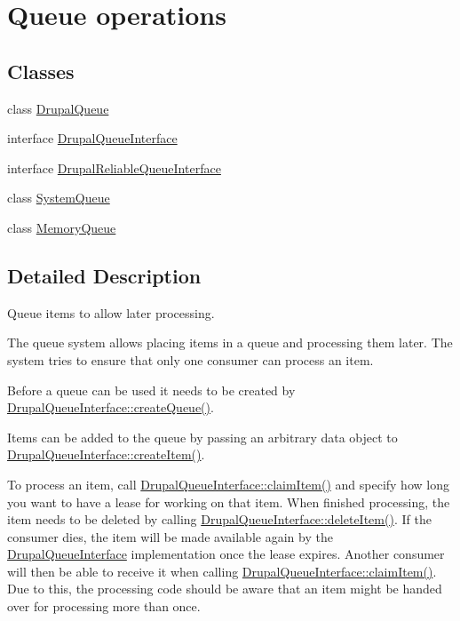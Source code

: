 \hypertarget{group__queue}{
\section{Queue operations}
\label{group__queue}
}
\subsection*{Classes}
\begin{DoxyCompactItemize}
\item 
class \hyperlink{classDrupalQueue}{DrupalQueue}
\item 
interface \hyperlink{interfaceDrupalQueueInterface}{DrupalQueueInterface}
\item 
interface \hyperlink{interfaceDrupalReliableQueueInterface}{DrupalReliableQueueInterface}
\item 
class \hyperlink{classSystemQueue}{SystemQueue}
\item 
class \hyperlink{classMemoryQueue}{MemoryQueue}
\end{DoxyCompactItemize}


\subsection{Detailed Description}
Queue items to allow later processing.

The queue system allows placing items in a queue and processing them later. The system tries to ensure that only one consumer can process an item.

Before a queue can be used it needs to be created by \hyperlink{interfaceDrupalQueueInterface_a5a657d8c1d5bb429b3e594fa0c883ad3}{DrupalQueueInterface::createQueue()}.

Items can be added to the queue by passing an arbitrary data object to \hyperlink{interfaceDrupalQueueInterface_a1bdef6341808aaf8b3de821b7b71f137}{DrupalQueueInterface::createItem()}.

To process an item, call \hyperlink{interfaceDrupalQueueInterface_a2f0f2ccc1f4d55c0890897ea85e75954}{DrupalQueueInterface::claimItem()} and specify how long you want to have a lease for working on that item. When finished processing, the item needs to be deleted by calling \hyperlink{interfaceDrupalQueueInterface_aa61212089c1bcc410e8f87f8e619e351}{DrupalQueueInterface::deleteItem()}. If the consumer dies, the item will be made available again by the \hyperlink{interfaceDrupalQueueInterface}{DrupalQueueInterface} implementation once the lease expires. Another consumer will then be able to receive it when calling \hyperlink{interfaceDrupalQueueInterface_a2f0f2ccc1f4d55c0890897ea85e75954}{DrupalQueueInterface::claimItem()}. Due to this, the processing code should be aware that an item might be handed over for processing more than once.

